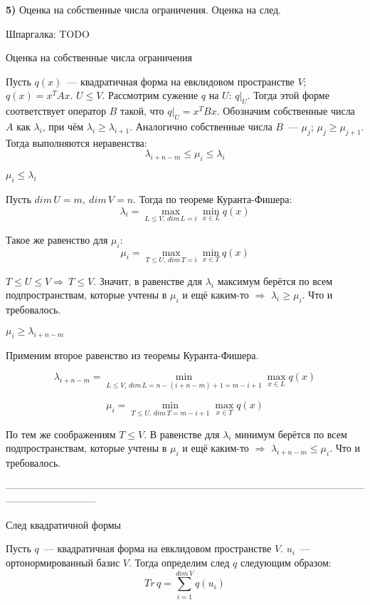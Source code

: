 {\bf5)} Оценка на собственные числа ограничения. Оценка на след.

Шпаргалка: TODO

\thrm Оценка на собственные числа ограничения

Пусть $q(x)$~--- квадратичная форма на евклидовом пространстве $V$; $q(x) = x^TAx$. $U \le V$. Рассмотрим сужение $q$ на $U$: $q|_U$. Тогда этой форме соответствует оператор $B$ такой, что $q|_U = x^TBx$. Обозначим собственные числа $A$ как $\lambda_i$, при чём $\lambda_i \ge \lambda_{i+1}$. Аналогично собственные числа $B$~--- $\mu_j$; $\mu_j\ge \mu_{j + 1}$. Тогда выполняются неравенства:
$$
\lambda_{i+n-m}\le\mu_i\le\lambda_i
$$

\proof

$\mu_i\le\lambda_i$

Пусть $dim\,U = m,\ dim\,V = n$. Тогда по теореме Куранта-Фишера:
$$
\lambda_i = \max\limits_{L \le V,\,dim\,L = i} \min\limits_{x\in L} q(x) 
$$

Такое же равенство для $\mu_i$:
$$
\mu_i = \max\limits_{T \le U,\,dim\,T = i} \min\limits_{x\in T} q(x) 
$$

$T\le U\le V\Rightarrow\ T\le V$. Значит, в равенстве для $\lambda_i$ максимум берётся по всем подпространствам, которые учтены в $\mu_i$ и ещё каким-то $\Rightarrow$ $\lambda_i \ge \mu_i$. Что и требовалось.

$\mu_i \ge \lambda_{i + n - m}$

Применим второе равенство из теоремы Куранта-Фишера.

$$
\lambda_{i+n-m} = \min\limits_{L \le V,\,dim\,L = n - (i + n - m) + 1 = m - i + 1} \max\limits_{x\in L} q(x) 
$$

$$
\mu_i = \min\limits_{T \le U,\,dim\,T = m - i + 1} \max\limits_{x\in T} q(x) 
$$

По тем же соображениям $T \le V$. В равенстве для $\lambda_i$ минимум берётся по всем подпространствам, которые учтены в $\mu_i$ и ещё каким-то $\Rightarrow$ $\lambda_{i + n - m}\le \mu_i$. Что и требовалось.

\endproof
\ethrm

---------------------------------------------------------------------------------------------------------------------------------------

\dfn След квадратичной формы
\edfn

Пусть $q$~--- квадратичная форма на евклидовом пространстве $V$. $u_i$~--- ортонормированный базис $V$. Тогда определим след $q$ следующим образом:
$$
Tr\,q=\sum\limits_{i=1}^{dim\,V} q(u_i)
$$

